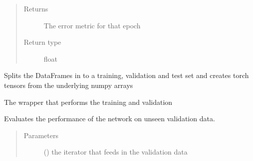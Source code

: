 \documentclass[letterpaper,10pt,english]{sphinxmanual}
\begin{document}
\begin{fulllineitems}
\begin{fulllineitems}
\begin{quote}
\begin{description}
\item[{Returns}] \leavevmode
The error metric for that epoch

\item[{Return type}] \leavevmode
float

\end{description}\end{quote}

\end{fulllineitems}


\begin{fulllineitems}
\label{\detokenize{deeplearning:Foresight.deeplearning.DeepLearning.train_val_test}}
Splits the DataFrames in to a training, validation
and test set and creates torch tensors from the underlying
numpy arrays

\end{fulllineitems}


\begin{fulllineitems}
\label{\detokenize{deeplearning:Foresight.deeplearning.DeepLearning.training_wrapper}}
The wrapper that performs the training and validation

\end{fulllineitems}


\begin{fulllineitems}
\label{\detokenize{deeplearning:Foresight.deeplearning.DeepLearning.validate}}
Evaluates the performance of the network on unseen validation data.
\begin{quote}\begin{description}
\item[{Parameters}] \leavevmode
{} () \textendash{} the iterator that feeds in the validation data


\end{description}
\end{quote}
\end{fulllineitems}
\end{fulllineitems}
\end{document}
